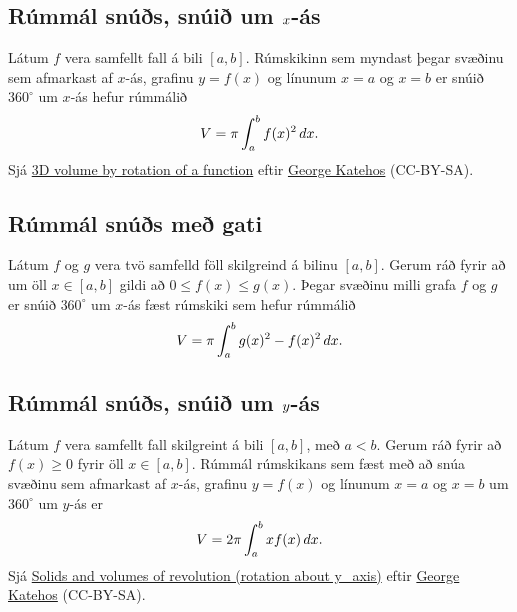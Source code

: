 \documentclass[a4paper,10pt,icelandic]{sphinxmanual}
\begin{document}

\subsection{Rúmmál snúðs, snúið um \protect\(x\protect\)-ás}
\label{kafli07:rummal-snus-snui-um-as}\label{kafli07:index-3}
Látum \(f\) vera samfellt fall á bili \([a, b]\). Rúmskikinn sem
myndast þegar svæðinu sem afmarkast af \(x\)-ás, grafinu
\(y=f(x)\) og línunum \(x=a\) og \(x=b\) er snúið
\(360^\circ\) um \(x\)-ás hefur rúmmálið
\begin{gather}
\begin{split}V=\pi\int_a^b f(x)^2\,dx.\end{split}\notag
\end{gather}
Sjá  \href{https://www.geogebra.org/m/40798}{3D volume by rotation of a function}
eftir \href{https://www.geogebra.org/material/show/id/40798}{George Katehos} (CC-BY-SA).


\subsection{Rúmmál snúðs með gati}
\label{kafli07:rummal-snus-me-gati}\label{kafli07:index-4}
Látum \(f\) og \(g\) vera tvö samfelld föll skilgreind á bilinu
\([a, b]\). Gerum ráð fyrir að um öll \(x\in [a, b]\) gildi að
\(0\leq f(x)\leq
g(x)\). Þegar svæðinu milli grafa \(f\) og \(g\) er snúið
\(360^\circ\) um \(x\)-ás fæst rúmskiki sem hefur rúmmálið
\begin{gather}
\begin{split}V=\pi\int_a^b g(x)^2-f(x)^2\,dx.\end{split}\notag
\end{gather}

\subsection{Rúmmál snúðs, snúið um \protect\(y\protect\)-ás}
\label{kafli07:id1}\label{kafli07:index-5}
Látum \(f\) vera samfellt fall skilgreint á bili \([a, b]\), með
\(a<b\). Gerum ráð fyrir að \(f(x)\geq 0\) fyrir öll
\(x\in [a, b]\). Rúmmál rúmskikans sem fæst með að snúa svæðinu sem
afmarkast af \(x\)-ás, grafinu \(y=f(x)\) og línunum \(x=a\)
og \(x=b\) um \(360^\circ\) um \(y\)-ás er
\begin{gather}
\begin{split}V=2\pi\int_a^b xf(x)\,dx.\end{split}\notag
\end{gather}
Sjá \href{https://www.geogebra.org/b/75281\#material/18475}{Solids and volumes of revolution (rotation about y\_axis)}
eftir \href{https://www.geogebra.org/b/75281\#material/18475}{George Katehos} (CC-BY-SA).
\end{document}
